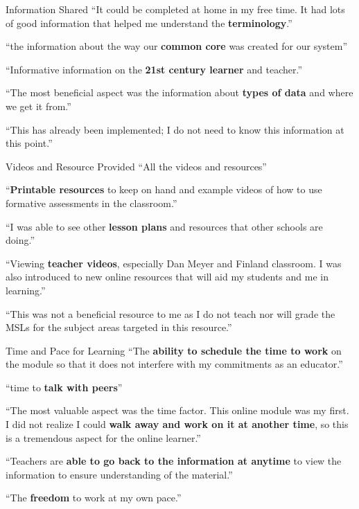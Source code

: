 \documentclass[
  ignorenonframetext,
]{beamer}
\begin{document}
\begin{frame}{Information Shared}
\protect\hypertarget{information-shared}{}
``It could be completed at home in my free time. It had lots of good
information that helped me understand the \textbf{terminology}.''

``the information about the way our \textbf{common core} was created for
our system''

``Informative information on the \textbf{21st century learner} and
teacher.''

``The most beneficial aspect was the information about \textbf{types of
data} and where we get it from.''

``This has already been implemented; I do not need to know this
information at this point.''
\end{frame}

\begin{frame}{Videos and Resource Provided}
\protect\hypertarget{videos-and-resource-provided}{}
``All the videos and resources''

``\textbf{Printable resources} to keep on hand and example videos of how
to use formative assessments in the classroom.''

``I was able to see other \textbf{lesson plans} and resources that other
schools are doing.''

``Viewing \textbf{teacher videos}, especially Dan Meyer and Finland
classroom. I was also introduced to new online resources that will aid
my students and me in learning.''

``This was not a beneficial resource to me as I do not teach nor will
grade the MSLs for the subject areas targeted in this resource.''
\end{frame}

\begin{frame}{Time and Pace for Learning}
\protect\hypertarget{time-and-pace-for-learning}{}
``The \textbf{ability to schedule the time to work} on the module so
that it does not interfere with my commitments as an educator.''

``time to \textbf{talk with peers}''

``The most valuable aspect was the time factor. This online module was
my first. I did not realize I could \textbf{walk away and work on it at
another time}, so this is a tremendous aspect for the online learner.''

``Teachers are \textbf{able to go back to the information at anytime} to
view the information to ensure understanding of the material.''

``The \textbf{freedom} to work at my own pace.''
\end{frame}
\end{document}
